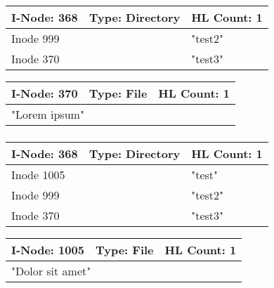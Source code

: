 \documentclass[a4paper, 11pt]{article}
\begin{document}
        \subsubsection{}
        \begin{table}[h!]
            \begin{tabular}{|l|l|l|}
            \hline
            I-Node: 368   & Type: Directory  & HL Count: 1 \\ \hline
            \multicolumn{2}{|l|}{Inode 999} & "test2"      \\ \hline
            \multicolumn{2}{|l|}{Inode 370} & "test3"     \\ \hline
            \end{tabular}
            \end{table}
            \begin{table}[h!]
                \begin{tabular}{|l|l|l|}
                \hline
                I-Node: 370 & Type: File & HL Count: 1 \\ \hline
                \multicolumn{3}{|l|}{"Lorem ipsum"}         \\ \hline
                \end{tabular}
                \end{table}
        \subsubsection{}
        \begin{table}[h!]
            \begin{tabular}{|l|l|l|}
            \hline
            I-Node: 368   & Type: Directory  & HL Count: 1 \\ \hline
            \multicolumn{2}{|l|}{Inode 1005} & "test"      \\ \hline
            \multicolumn{2}{|l|}{Inode 999} & "test2"     \\ \hline
            \multicolumn{2}{|l|}{Inode 370} & "test3"     \\ \hline
            \end{tabular}
            \end{table}
            \begin{table}[h!]
                \begin{tabular}{|l|l|l|}
                \hline
                I-Node: 1005 & Type: File & HL Count: 1 \\ \hline
                \multicolumn{3}{|l|}{"Dolor sit amet"}         \\ \hline
                \end{tabular}
                \end{table}
\end{document}
